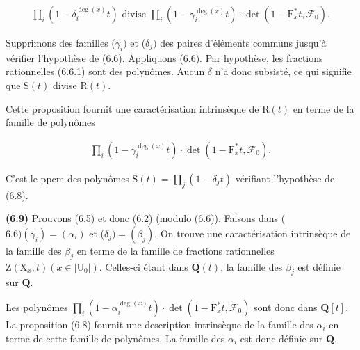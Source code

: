 \documentclass[10pt,leqno]{article}
\begin{document}
\begin{equation*}\begin{gathered}\prod _{i}(1- \delta _{i}^{\operatorname{deg}(x)}t)\text{ divise }\prod _{i}(1- \gamma _{i}^{\operatorname{deg}(x)}t)\cdot \operatorname{det}(1- \mathrm{F}_{x}^{*}t,\mathcal{F} _{0}).\end{gathered}\end{equation*}

\par

\noindent Supprimons des familles (\(\gamma _{i})\) et (\(\delta _{j})\) des paires d’éléments communs jusqu’à vérifier l’hypothèse de (6.6). Appliquons (6.6). Par hypothèse, les fractions rationnelles (6.6.1) sont des polynômes. Aucun \(\delta \) n’a donc subsisté, ce qui signifie que \(\mathrm{S}(t)\) divise \(\mathrm{R}(t)\).\par

\noindent Cette proposition fournit une caractérisation intrinsèque de \(\mathrm{R}(t)\) en terme de la famille de polynômes\par

\begin{equation*}\begin{gathered}\prod _{i}(1- \gamma _{i}^{\operatorname{deg}(x)}t)\cdot \operatorname{det}(1- \mathrm{F}_{x}^{*}t,\mathcal{F} _{0}).\end{gathered}\end{equation*}

\noindent C’est le ppcm des polynômes \(\mathrm{S}(t)=\prod _{j}(1- \delta _{j} t)\) vérifiant l’hypothèse de (6.8).\par

\noindent \textbf{(6.9)} Prouvons (6.5) et donc (6.2) (modulo (6.6)). Faisons dans (\(6.6) (\gamma _{i})=(\alpha _{i})\) et (\(\delta _{j})=(\beta _{j})\). On trouve une caractérisation intrinsèque de la famille des \(\beta _{j}\) en terme de la famille de fractions rationnelles \(\mathrm{Z}(\mathrm{X}_{x},t) (x\in |\mathrm{U}_{0}|)\). Celles-ci étant dans \(\mathbf{Q}(t)\), la famille des \(\beta _{j}\) est définie sur \(\mathbf{Q}\).\par

\noindent Les polynômes \(\prod _{i}(1- \alpha _{i}^{\operatorname{deg}(x)}t)\cdot \operatorname{det}(1- \mathrm{F}_{x}^{*}t,\mathcal{F} _{0})\) sont donc dans \(\mathbf{Q}[t]\). La proposition (6.8) fournit une description intrinsèque de la famille des \(\alpha _{i}\) en terme de cette famille de polynômes. La famille des \(\alpha _{i}\) est donc définie sur \(\mathbf{Q}\).\par
\end{document}
